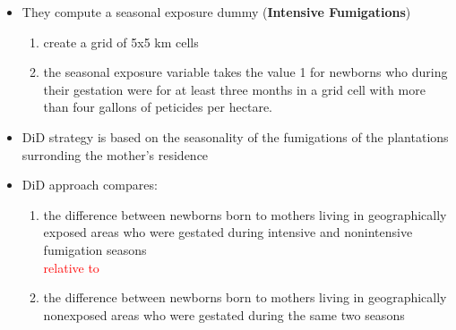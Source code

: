 \documentclass[hyperref={pdfpagelabels=false}]{beamer}
\begin{document}
        \begin{frame}{}
            \begin{itemize}
            \justifying
                \item They compute a seasonal exposure dummy (\textcolor{myblue}{\textbf{Intensive Fumigations}})
                \begin{enumerate}
                \justifying
                    \item create a grid of 5x5 km cells
                    \item the seasonal exposure variable takes the value 1 for newborns who during their gestation were for at least three months in a grid cell with more than four gallons of peticides per hectare.
                   \end{enumerate}
                  \item DiD strategy is based on the seasonality of the fumigations of the plantations surronding the mother's residence
                  \vspace{2mm}
                 \item DiD approach compares:
                 \begin{enumerate}
                 \justifying
                     \item  the difference between newborns born to mothers living in geographically exposed areas who were gestated during intensive and nonintensive fumigation seasons \\
                     \textcolor{red}{relative to}
                     \item the difference between newborns born to mothers living in geographically nonexposed areas who were gestated during the same two seasons
                 \end{enumerate}
            \end{itemize}
        \end{frame}
\end{document}
